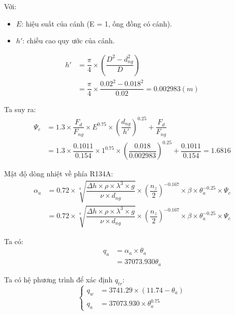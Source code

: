 Với:
\begin{itemize}
	\item $E$: hiệu suất của cánh (E = 1, ống đồng có cánh).
	\item $h'$: chiều cao quy ước của cánh.
\end{itemize}
\begin{equation*}
	\begin{split}
		h' &= \dfrac{\pi}{4}\times\left(\dfrac{D^2 - d_{ng}^2}{D}\right)\\
		&=\dfrac{\pi}{4} \times \dfrac{0.02^2-0.018^2}{0.02}=0.002983(m)
	\end{split}
\end{equation*}

Ta suy ra:
\begin{equation*}
\begin{split}
		\Psi_{c} &= 1.3\times\dfrac{F_{d}}{F_{ng}}\times E^{0.75}\times\left(\dfrac{d_{ng}}{h'}\right)^{0.25} + \dfrac{F_{d}}{F_{ng}}\\
		&=1.3 \times \dfrac{0.1011}{0.154} \times 1^{0.75} \times (\dfrac{0.018}{0.002983})^{0.25} + \dfrac{0.1011}{0.154}= 1.6816
\end{split}
\end{equation*}

Mật độ dòng nhiệt về phía R134A:
\begin{equation*}
	\begin{split}
		\alpha_{a} &= 0.72\times\sqrt[4]{\dfrac{\Delta h\times \rho\times\lambda^3\times g}{\nu\times d_{ng}}}\times\left(\dfrac{n_{z}}{2}\right)^{-0.167}\times\beta\times\theta^{-0.25}_{a}\times\Psi_{c} \\
		&=0.72\times\sqrt[4]{\dfrac{\Delta h\times \rho\times\lambda^3\times g}{\nu\times d_{ng}}}\times\left(\dfrac{n_{z}}{2}\right)^{-0.167}\times\beta\times\theta^{-0.25}_{a}\times\Psi_{c}
	\end{split}
\end{equation*}

Ta có: 
\begin{equation*}
\begin{split}
		q_{a} &= \alpha_{a}\times\theta_{a}\\
		&=37073.930\theta_{a}
\end{split}
\end{equation*}

Ta có hệ phương trình để xác định $q_{tr}$:
\begin{equation*}
	\begin{cases}
		q_{w} &= 3741.29\times(11.74 - \theta_{a}) \\
		q_{a} &= 37073.930\times\theta_{a}^{0.75}
	\end{cases}
\end{equation*}


